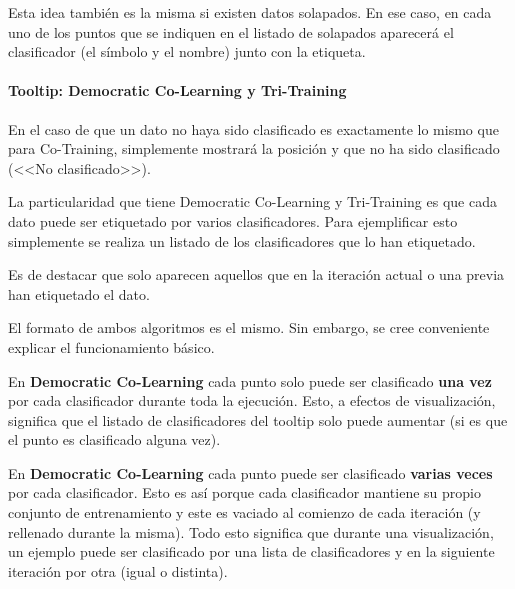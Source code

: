 
Esta idea también es la misma si existen datos solapados. En ese caso, en cada
uno de los puntos que se indiquen en el listado de solapados aparecerá el
clasificador (el símbolo y el nombre) junto con la etiqueta.


\paragraph{Tooltip: Democratic Co-Learning y Tri-Training}

En el caso de que un dato no haya sido clasificado es exactamente lo mismo que
para Co-Training, simplemente mostrará la posición y que no ha sido clasificado
(<<No clasificado>>).

La particularidad que tiene Democratic Co-Learning y Tri-Training es que cada
dato puede ser etiquetado por varios clasificadores. Para ejemplificar esto
simplemente se realiza un listado de los clasificadores que lo han etiquetado.


Es de destacar que solo aparecen aquellos que en la iteración actual o una
previa han etiquetado el dato.

El formato de ambos algoritmos es el mismo. Sin embargo, se cree conveniente
explicar el funcionamiento básico.

En \textbf{Democratic Co-Learning} cada punto solo puede ser clasificado
\textbf{una vez} por cada clasificador durante toda la ejecución. Esto, a
efectos de visualización, significa que el listado de clasificadores del tooltip
solo puede aumentar (si es que el punto es clasificado alguna vez).

En \textbf{Democratic Co-Learning} cada punto puede ser clasificado
\textbf{varias veces} por cada clasificador. Esto es así porque cada
clasificador mantiene su propio conjunto de entrenamiento y este es vaciado al
comienzo de cada iteración (y rellenado durante la misma). Todo esto significa
que durante una visualización, un ejemplo puede ser clasificado por una lista de
clasificadores y en la siguiente iteración por otra (igual o distinta).

